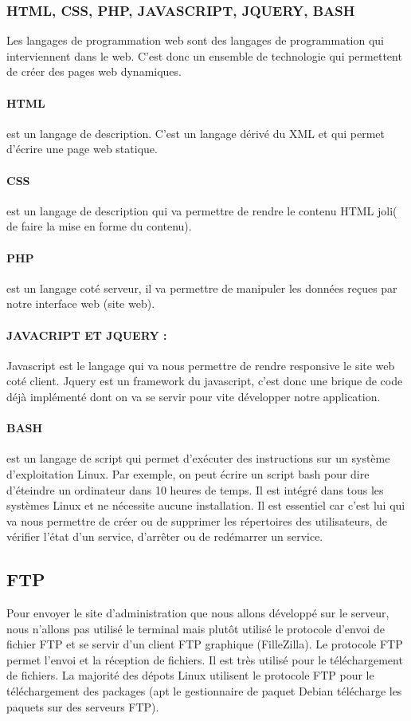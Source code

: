 \documentclass[a4paper,12pt,french]{report} %
\begin{document}
\subsubsection{HTML, CSS, PHP, JAVASCRIPT, JQUERY, BASH}
Les langages de programmation  web sont des langages de programmation qui interviennent dans le web. C'est donc un ensemble de technologie qui permettent de créer des pages web dynamiques.
\paragraph{HTML} est un langage de description. C'est un langage dérivé du XML et qui permet d'écrire une page web statique. 
\paragraph{CSS} est un langage de description qui va permettre de rendre le contenu HTML joli( de faire la mise en forme du contenu).
\paragraph{PHP} est un langage coté serveur, il va permettre de manipuler les données reçues par notre interface web (site web).
\paragraph{JAVACRIPT ET JQUERY :} Javascript est le langage qui va nous permettre de rendre responsive le site web coté client. Jquery est un framework du javascript, c'est donc une brique de code déjà implémenté dont on va se servir pour vite développer notre application.
\paragraph{BASH} est un langage de script qui permet d'exécuter des instructions sur un système d'exploitation Linux. Par exemple, on peut écrire un script bash pour dire d'éteindre un ordinateur dans 10 heures de temps. Il est intégré dans tous les systèmes Linux et ne nécessite aucune installation. Il est essentiel car c'est lui qui va nous permettre de créer ou de supprimer les répertoires des utilisateurs, de vérifier l'état d'un service, d'arrêter ou de redémarrer un service.

\subsection{FTP} 
Pour envoyer le site d'administration que nous allons développé sur le serveur, nous n'allons pas utilisé le terminal mais plutôt utilisé le protocole d'envoi de fichier FTP et se servir d'un client FTP graphique (FilleZilla). 
Le protocole FTP permet l'envoi et la réception de fichiers. Il est très utilisé pour le téléchargement de fichiers. La majorité des dépots Linux utilisent le protocole FTP pour le téléchargement des packages (apt le gestionnaire de paquet Debian télécharge les paquets sur des serveurs FTP).
\end{document}
